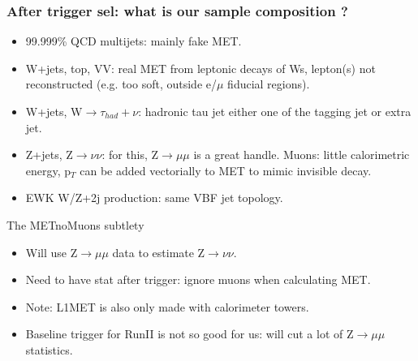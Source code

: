 \documentclass[red,compress,xcolor=table]{beamer}
\begin{document}
\begin{frame}
\frametitle{After trigger sel: what is our sample composition ?}

\begin{itemize}
\item \scriptsize 99.999\% QCD multijets: mainly fake MET.
\item \scriptsize W+jets, top, VV: real MET from leptonic decays of Ws, lepton(s) not reconstructed (e.g. too soft, outside e/$\mu$ fiducial regions).
\item \scriptsize W+jets, W$\rightarrow\tau_{had}+\nu$: hadronic tau jet either one of the tagging jet or extra jet.
\item \scriptsize Z+jets, Z$\rightarrow \nu\nu$: for this, Z$\rightarrow \mu\mu$ is a great handle. Muons: little calorimetric energy, p$_T$ can be added vectorially to MET to mimic invisible decay.
\item \scriptsize EWK W/Z+2j production: same VBF jet topology.
\end{itemize}

\begin{block}{\scriptsize The METnoMuons subtlety}
\begin{itemize}
\item \scriptsize Will use Z$\rightarrow \mu\mu$ data to estimate Z$\rightarrow \nu\nu$.
\item \scriptsize Need to have stat after trigger: ignore muons when calculating MET.
\item \scriptsize Note: L1MET is also only made with calorimeter towers.
\item \scriptsize Baseline trigger for RunII is not so good for us: will cut a lot of Z$\rightarrow \mu\mu$ statistics.
\end{itemize}
\end{block}


\end{frame}
\end{document}
